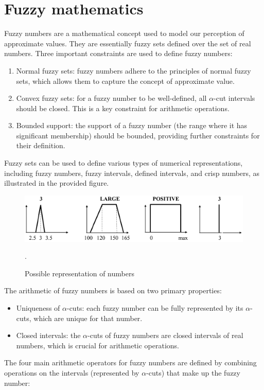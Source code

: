 \documentclass[12pt, a4paper]{report}
\begin{document}
    \section{Fuzzy mathematics}
    Fuzzy numbers are a mathematical concept used to model our perception of approximate values. 
    They are essentially fuzzy sets defined over the set of real numbers. 
    Three important constraints are used to define fuzzy numbers:
    \begin{enumerate}
        \item Normal fuzzy sets: fuzzy numbers adhere to the principles of normal fuzzy sets, which allows them to capture the concept of approximate value.
        \item Convex fuzzy sets: for a fuzzy number to be well-defined, all $\alpha$-cut intervals should be closed. This is a key constraint for arithmetic operations.
        \item Bounded support: the support of a fuzzy number (the range where it has significant membership) should be bounded, providing further constraints for their definition.
    \end{enumerate}
    Fuzzy sets can be used to define various types of numerical representations, including fuzzy numbers, fuzzy intervals, defined intervals, and crisp numbers, as illustrated in the provided figure.
    \begin{figure}[H]
        \centering
        \includegraphics[width=0.75\linewidth]{images/numbers.png}
        \caption{Possible representation of numbers}.
    \end{figure}
    The arithmetic of fuzzy numbers is based on two primary properties:
    \begin{itemize}
        \item Uniqueness of $\alpha$-cuts: each fuzzy number can be fully represented by its $\alpha$-cuts, which are unique for that number.
        \item Closed intervals: the $\alpha$-cuts of fuzzy numbers are closed intervals of real numbers, which is crucial for arithmetic operations.
    \end{itemize}
    The four main arithmetic operators for fuzzy numbers are defined by combining operations on the intervals (represented by $\alpha$-cuts) that make up the fuzzy number:
\end{document}
